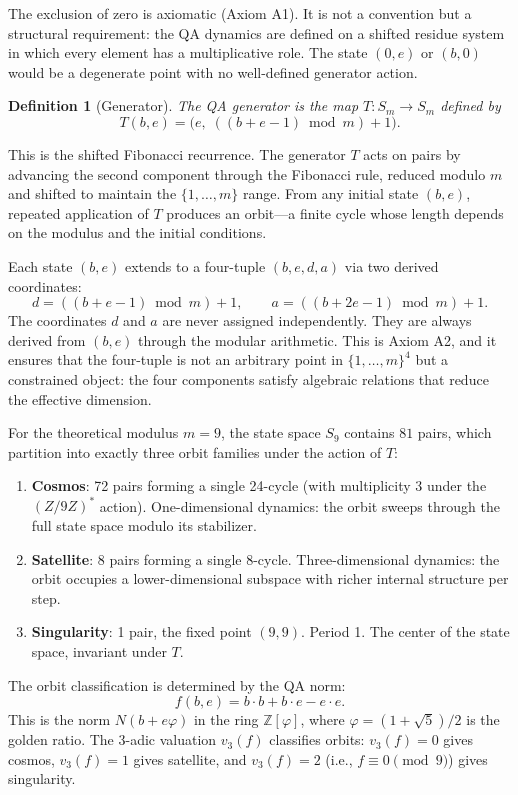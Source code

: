 \documentclass[11pt,a4paper]{article}
\newtheorem{definition}[theorem]{Definition}
\begin{document}
The exclusion of zero is axiomatic (Axiom A1). It is not a convention but
a structural requirement: the QA dynamics are defined on a shifted residue
system in which every element has a multiplicative role. The state
$(0, e)$ or $(b, 0)$ would be a degenerate point with no well-defined
generator action.

\begin{definition}[Generator]
The QA generator is the map $T \colon S_m \to S_m$ defined by
\[
T(b, e) = \bigl(e,\; ((b + e - 1) \bmod m) + 1\bigr).
\]
\end{definition}

This is the shifted Fibonacci recurrence. The generator $T$ acts on
pairs by advancing the second component through the Fibonacci rule,
reduced modulo $m$ and shifted to maintain the $\{1, \ldots, m\}$ range.
From any initial state $(b, e)$, repeated application of $T$ produces an
orbit---a finite cycle whose length depends on the modulus and the
initial conditions.

Each state $(b, e)$ extends to a four-tuple $(b, e, d, a)$ via two derived
coordinates:
\[
d = ((b + e - 1) \bmod m) + 1, \qquad a = ((b + 2e - 1) \bmod m) + 1.
\]
The coordinates $d$ and $a$ are never assigned independently. They are
always derived from $(b, e)$ through the modular arithmetic. This is
Axiom A2, and it ensures that the four-tuple is not an arbitrary point in
$\{1, \ldots, m\}^4$ but a constrained object: the four components satisfy
algebraic relations that reduce the effective dimension.

For the theoretical modulus $m = 9$, the state space $S_9$ contains
$81$ pairs, which partition into exactly three orbit families under
the action of $T$:

\begin{enumerate}[label=(\roman*)]
\item \textbf{Cosmos}: 72 pairs forming a single 24-cycle (with
multiplicity 3 under the $(Z/9Z)^*$ action). One-dimensional dynamics:
the orbit sweeps through the full state space modulo its stabilizer.
\item \textbf{Satellite}: 8 pairs forming a single 8-cycle.
Three-dimensional dynamics: the orbit occupies a lower-dimensional
subspace with richer internal structure per step.
\item \textbf{Singularity}: 1 pair, the fixed point $(9, 9)$. Period 1.
The center of the state space, invariant under $T$.
\end{enumerate}

The orbit classification is determined by the QA norm:
\[
f(b, e) = b \cdot b + b \cdot e - e \cdot e.
\]
This is the norm $N(b + e\varphi)$ in the ring $\mathbb{Z}[\varphi]$,
where $\varphi = (1 + \sqrt{5})/2$ is the golden ratio. The
$3$-adic valuation $v_3(f)$ classifies orbits: $v_3(f) = 0$ gives
cosmos, $v_3(f) = 1$ gives satellite, and $v_3(f) = 2$ (i.e.,
$f \equiv 0 \pmod{9}$) gives singularity.
\end{document}
